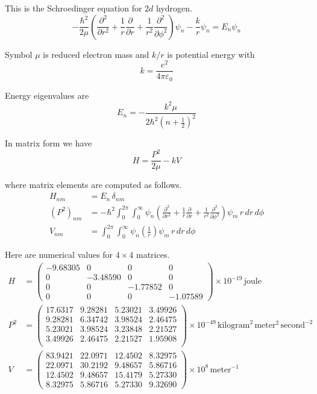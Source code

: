\documentclass[12pt]{article}
\begin{document}
\noindent
This is the Schroedinger equation for $2d$ hydrogen.
\begin{equation*}
-\frac{\hbar^2}{2\mu}
\left(
\frac{\partial^2}{\partial r^2} +
\frac{1}{r}\frac{\partial}{\partial r}+
\frac{1}{r^2}\frac{\partial^2}{\partial\phi^2}
\right)\psi_n
-\frac{k}{r}\psi_n
=E_n\psi_n
\end{equation*}

\noindent
Symbol $\mu$ is reduced electron mass and $k/r$ is potential energy with
\begin{equation*}
k=\frac{e^2}{4\pi\varepsilon_0}
\end{equation*}

\noindent
Energy eigenvalues are
\begin{equation*}
E_n=-\frac{k^2\mu}{2\hbar^2\left(n+\tfrac{1}{2}\right)^2}
\end{equation*}

\noindent
In matrix form we have
\begin{equation*}
H=\frac{P^2}{2\mu}-kV
\end{equation*}

\noindent
where matrix elements are computed as follows.
\begin{align*}
H_{nm}&=E_n\,\delta_{nm}
\\[2ex]
\left(P^2\right)_{nm}&=-\hbar^2\int_0^{2\pi}\int_0^\infty
\psi_n
\left(
\frac{\partial^2}{\partial r^2} +
\frac{1}{r}\frac{\partial}{\partial r}+
\frac{1}{r^2}\frac{\partial^2}{\partial\phi^2}
\right)
\psi_m
\,r\,dr\,d\phi
\\[2ex]
V_{nm}&=\int_0^{2\pi}\int_0^\infty
\psi_n
\left(\frac{1}{r}\right)
\psi_m
\,r\,dr\,d\phi
\end{align*}

\noindent
Here are numerical values for $4\times4$ matrices.
\begin{align*}
H&=\begin{pmatrix}
-9.68305 & 0 & 0 & 0 \\[1ex]
0 & -3.48590 & 0 & 0 \\[1ex]
0 & 0 & -1.77852 & 0 \\[1ex]
0 & 0 & 0 & -1.07589
\end{pmatrix}\times10^{-19}\,\text{joule}
\\[2ex]
P^2&=\begin{pmatrix}
17.6317 & 9.28281 & 5.23021 & 3.49926 \\[1ex]
9.28281 & 6.34742 & 3.98524 & 2.46475 \\[1ex]
5.23021 & 3.98524 & 3.23848 & 2.21527 \\[1ex]
3.49926 & 2.46475 & 2.21527 & 1.95908 \\[1ex]
\end{pmatrix}\times10^{-49}\,\text{kilogram}^2\,\text{meter}^2\,\text{second}^{-2}
\\[2ex]
V&=\begin{pmatrix}
83.9421 & 22.0971 & 12.4502 & 8.32975 \\[1ex]
22.0971 & 30.2192 & 9.48657 & 5.86716 \\[1ex]
12.4502 & 9.48657 & 15.4179 & 5.27330 \\[1ex]
8.32975 & 5.86716 & 5.27330 & 9.32690
\end{pmatrix}\times10^8\,\text{meter}^{-1}
\end{align*}
\end{document}
